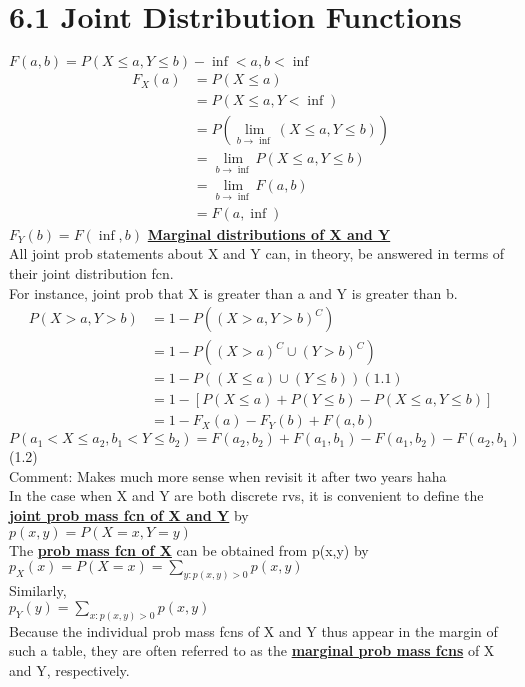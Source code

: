 \documentclass{article}
\begin{document}
\section*{6.1 Joint Distribution Functions}
$F(a,b) = P(X \leq a, Y \leq b) -\inf < a, b < \inf$ 
\begin{align*}
F_X(a)  &= P(X \leq a) \\ 
        &= P(X \leq a, Y < \inf) \\ 
        &= P(\lim_{b \rightarrow \inf}(X \leq a, Y \leq b)) \\ 
        &= \lim_{b \rightarrow \inf} P(X \leq a, Y \leq b) \\ 
        &=\lim_{b \rightarrow \inf} F(a,b) \\ 
        &= F(a, \inf)
\end{align*}
$ F_Y(b) = F(\inf, b)$ \underline{\textbf{Marginal distributions of X and Y}} \\ 
All joint prob statements about X and Y can, in theory, be answered in terms of their joint distribution fcn. \\
For instance, joint prob that X is greater than a and Y is greater than b. 
\begin{align*}
P(X>a, Y>b) &= 1- P((X > a, Y > b)^C) \\ 
            &= 1- P((X > a)^C \cup (Y > b)^C) \\
            &= 1 - P((X \leq a) \cup (Y \leq b))  (1.1) \\
            &= 1 - [P(X \leq a) + P(Y \leq b) - P(X \leq a, Y \leq b)]\\
            &= 1 - F_X(a) - F_Y(b) + F(a,b) 
\end{align*}
$P(a_1 < X \leq a_2, b_1 < Y \leq b_2) = F(a_2, b_2) + F(a_1, b_1) - F(a_1, b_2) - F(a_2, b_1)$ (1.2)\\ 
Comment: Makes much more sense when revisit it after two years haha \\ 
In the case when X and Y are both discrete rvs, it is convenient to define the \underline{\textbf{joint prob mass fcn of X and Y}} by \\
$p(x,y) = P(X=x, Y=y)$ \\
The \underline{\textbf{prob mass fcn of X}} can be obtained from p(x,y) by \\
$ p_X(x) = P(X=x) = \sum_{y:p(x,y) > 0}p(x,y)$ \\
Similarly, \\
$ p_Y(y) = \sum_{x:p(x,y) > 0}p(x,y)$\\
Because the individual prob mass fcns of X and Y thus appear in the margin of such a table, they are often referred to as the \underline{\textbf{marginal prob mass fcns}} of X and Y, respectively. \\
\end{document}

